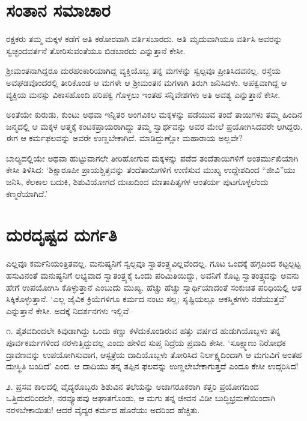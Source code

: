 \section{ಸಂತಾನ ಸಮಾಚಾರ}

ರಕ್ಷಕರು ತಮ್ಮ ಮಕ್ಕಳ ಕಡೆಗೆ ಅತಿ ಕಠೋರವಾಗಿ ವರ್ತಿಸಬಾರದು. ಅತಿ ಮೃದುವಾಗಿಯೂ ವರ್ತಿಸಿ ಅವರನ್ನು ಸ್ವಚ್ಛಂದವರ್ತನೆ ತೋರಿಸುವಂತೆಯೂ ಬಿಡಬಾರದು ಎನ್ನುತ್ತಾನೆ ಕೇಸೀ.

ಶ‍್ರೀಮಂತನಾಗಿದ್ದರೂ ದುರಹಂಕಾರಿಯಾಗಿದ್ದ ವ್ಯಕ್ತಿಯೊಬ್ಬ ತನ್ನ ಮಗಳನ್ನು ಸ್ವಲ್ಪವೂ ಪ್ರೀತಿಸಿದವನಲ್ಲ. ರಸ್ತೆಯ ಅವಘಡವೊಂದರಲ್ಲಿ ತೀರಿಕೊಂಡ ಆ ಮಗಳೇ ಆ ಶ‍್ರೀಮಂತನ ಮಗಳಾಗಿ ತಿರುಗಿ ಜನಿಸಿದಳು. ಅಪಕ್ವವಾಗಿದ್ದ ಆ ವ್ಯಕ್ತಿಯ ಮನಸ್ಸು ವಿಕಾಸಹೊಂದಿ ಪರಿಪಕ್ವ ಗೊಳ್ಳಲು ಇಂತಹ ಸನ್ನಿವೇಶಗಳು ಅತಿ ಅವಶ್ಯ ಎನ್ನುತ್ತಾನೆ ಕೇಸೀ.

ಅಂತೆಯೇ ಕುರುಡು, ಕುಂಟು ಅಥವಾ ಇನ್ನಿತರ ಅಂಗವಿಕಲ ಮಕ್ಕಳನ್ನು ಪಡೆಯುವ ತಂದೆ ತಾಯಿಗಳು ತಮ್ಮ ಹಿಂದಿನ ಜನ್ಮದಲ್ಲಿ ಆ ಮಕ್ಕಳ ಆತ್ಮಕ್ಕೆ ಕಂಟಕಪ್ರಾಯರಾಗಿದ್ದು ತಮ್ಮ ಸ್ವಾರ್ಥವನ್ನು ಅವರ ಮೇಲೆ ಪ್ರಯೋಗಿಸಿದವರೇ ಆಗಿದ್ದರು. ಈಗ ಆ ಕರ್ಮಫಲವನ್ನು ಅವರೇ ಉಣ್ಣಬೇಕಾಗಿದೆ. ಮಾಡಿದ್ದುಣ್ಣೋ ಮಹಾರಾಯ ಅಲ್ಲವೇ?

ಬಾಲ್ಯದಲ್ಲಿಯೇ ಅಥವಾ ಹುಟ್ಟುವಾಗಲೇ ತೀರಿಹೋಗುವ ಮಕ್ಕಳನ್ನು ಪಡೆದ ತಂದೆತಾಯಿಗಳಿಗೆ ಅಂತರ್ಮುಖಿಯಾಗಿ ಕೇಸೀ ತಿಳಿಸಿದ: ‘ಶಿಕ್ಷಾರೂಪೀ ಪ್ರಾಯಶ್ಚಿತ್ತವನ್ನು ತಂದೆತಾಯಿಗಳಿಗೆ ಉಣಿಸುವ ಮುಖ್ಯ ಉದ್ದೇಶದಿಂದ “ಜೀವಿ”ಯು ಜನಿಸಿ, ಕೆಲಕಾಲ ಬದುಕಿ, ಶಿಶುವಿಯೋಗದ ದುಃಖದಿಂದ ಮಾತಾಪಿತೃಗಳ ಆಂತರ್ಯ ಪುಟಗೊಳ್ಳಲೆಂದು ಕಣ್ಮರೆಯಾಗಿದೆ.’


\section{ದುರದೃಷ್ಟದ ದುರ್ಗತಿ}

ಎಲ್ಲವೂ ಕರ್ಮನಿಯಂತ್ರಿತವಲ್ಲ. ಮನುಷ್ಯನಿಗೆ ಸ್ವಲ್ಪವೂ ಸ್ವಾತಂತ್ರ್ಯವಿಲ್ಲವೆಂದಲ್ಲ. ಗೂಟ ಒಂದಕ್ಕೆ ಹಗ್ಗದಿಂದ ಕಟ್ಟಲ್ಪಟ್ಟ ಹಸುವಿನಂತೆ ಮನುಷ್ಯನಿಗೆ ಲಭ್ಯವಾದ ಸ್ವಾತಂತ್ರ್ಯಕ್ಕೆ ಒಂದು ಪರಿಮಿತಿಯಿದ್ದು, ಅವನಿಗೆ ಕೊಟ್ಟ ಸ್ವಾತಂತ್ರ್ಯವನ್ನು ಅವನು ಹೇಗೆ ಉಪಯೋಗಿಸಿ ಕೊಳ್ಳುತ್ತಾನೆ ಎಂಬುದು ಮುಖ್ಯ. ಹೆಚ್ಚು ಹೆಚ್ಚು ಸ್ವಾರ್ಥಿಯಾದಂತೆ ಸಂಕುಚಿತ ಪರಿಧಿಯಲ್ಲಿ ಆತ ಸಿಕ್ಕಿಕೊಳ್ಳುತ್ತಾನೆ. ‘ಎಲ್ಲ ಜೈವಿಕ ಕ್ರಿಯೆಗಳಿಗೂ ಕರ್ಮದ ನಂಟು ಸಲ್ಲ; ಸೃಷ್ಟಿಯಲ್ಲೂ ಆಕಸ್ಮಿಕಗಳು ನಡೆಯುತ್ತವೆ’ ಎನ್ನುತ್ತಾನೆ ಕೇಸೀ. ಅದಕ್ಕೆ ನಿದರ್ಶನಗಳು ಇಲ್ಲಿವೆ–

೧. ಶೈಶವದಿಂದಲೇ ಕಿವುಡಾಗಿದ್ದು ಒಂದು ಕಣ್ಣು ಕಳೆದುಕೊಂಡಿರುವ ಹತ್ತು ವರ್ಷದ ಹುಡುಗಿಯೊಬ್ಬಳು ತನ್ನ ಪೂರ್ವಕರ್ಮಗಳಿಂದ ನರಳುತ್ತಿದ್ದುದಲ್ಲ ಎಂದು ಹೇಳಿದ ಸುಪ್ತ ನಿದ್ರೆಯ ಪ್ರವಾದಿ ಕೇಸೀ. ‘ಸೂಕ್ಷ್ಮಾಣು ನಿರೋಧಕ ದ್ರಾವಣವನ್ನು ಉಪಯೋಗಿಸುವಾಗ, ಆಸ್ಪತ್ರೆಯ ದಾದಿಯೊಬ್ಬಳು ತೋರಿಸಿದ ನಿರ್ಲಕ್ಷ್ಯದಿಂದಾಗಿ ಆ ಮಗುವಿಗೆ ಅಂತಹ ದುಃಸ್ಥಿತಿ ಬಂದಿದೆ’ ಎಂದ. ಆ ದಾದಿಯು ತನ್ನ ತಪ್ಪಿನ ಫಲವನ್ನು ಉಣ್ಣಲೇಬೇಕಾಗುತ್ತದೆ ಎಂದೂ ಕೇಸೀ ಉದ್ಗರಿಸಿದ!

೨. ಪ್ರಸವ ಕಾಲದಲ್ಲಿ ವೈದ್ಯರೊಬ್ಬರು ಶಿಶುವಿನ ತಲೆಯನ್ನು ಅಜಾಗರೂಕರಾಗಿ ಕತ್ತರಿ ಪ್ರಯೋಗದಿಂದ ಒತ್ತಿದುದರಿಂದಲೇ, ನರವ್ಯೂಹವು ಆಘಾತಗೊಂಡು, ಆ ಮಗು ತನ್ನ ಜೀವನ ವಿಡೀ ಬುದ್ಧಿಭ್ರಮಣೆಯಿಂದಾಗಿ ನರಳಬೇಕಾಯಿತು! ಆದರೆ ವೈದ್ಯರ ಕರ್ಮದ ಹೊರೆಯು ಅದರಿಂದ ಹೆಚ್ಚಿತು.


